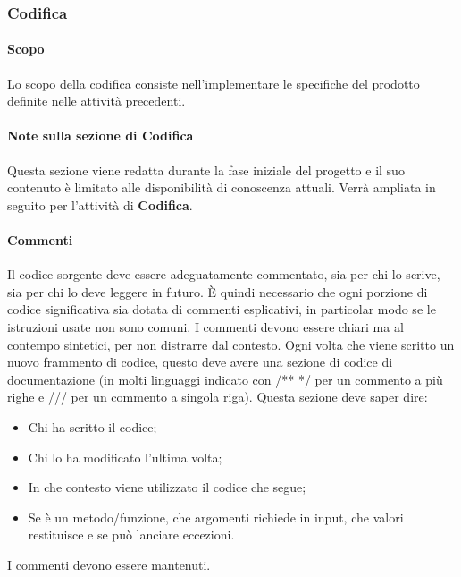 \subsubsection{Codifica}
\paragraph{Scopo}\hbox{}
Lo scopo della codifica consiste nell'implementare le specifiche del prodotto definite nelle attività precedenti.

\paragraph{Note sulla sezione di Codifica}\hbox{}
Questa sezione viene redatta durante la fase iniziale del progetto e il suo contenuto è limitato alle disponibilità di conoscenza attuali.
Verrà ampliata in seguito per l'attività di \textbf{Codifica}.

\paragraph{Commenti}\hbox{}
Il codice sorgente deve essere adeguatamente commentato, sia per chi lo scrive, sia per chi lo deve leggere in futuro.
È quindi necessario che ogni porzione di codice significativa sia dotata di commenti esplicativi, in particolar modo se le istruzioni usate non sono comuni.
I commenti devono essere chiari ma al contempo sintetici, per non distrarre dal contesto.
Ogni volta che viene scritto un nuovo frammento di codice, questo deve avere una sezione di codice di documentazione (in molti linguaggi indicato con /** */ per un commento a più righe e /// per un commento a singola riga).
Questa sezione deve saper dire:
\begin{itemize}
    \item Chi ha scritto il codice;
    \item Chi lo ha modificato l'ultima volta;
    \item In che contesto viene utilizzato il codice che segue;
    \item Se è un metodo/funzione, che argomenti richiede in input, che valori restituisce e se può lanciare eccezioni.
\end{itemize}
I commenti devono essere mantenuti.

